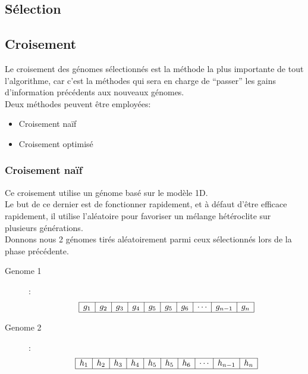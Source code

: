         \subsection{Sélection}
        \subsection{Croisement}
            Le croisement des génomes sélectionnés est la méthode la plus importante de tout l'algorithme, car c'est la méthodes qui sera en charge de ``passer'' les gains d'information précédents aux nouveaux génomes.\\
            Deux méthodes peuvent être employées:
            \begin{itemize}
                \item Croisement naïf
                \item Croisement optimisé
            \end{itemize}
            \subsubsection{Croisement naïf}
                Ce croisement utilise un génome basé sur le modèle 1D.\\
                Le but de ce dernier est de fonctionner rapidement, et à défaut d'être efficace rapidement, il utilise l'aléatoire pour favoriser un mélange hétéroclite sur plusieurs générations.\\
                    Donnons nous 2 génomes tirés aléatoirement parmi ceux sélectionnés lors de la phase précédente.\\
                    \begin{description}
                        \item[Genome 1]:\\
                            \[
                                \begin{array}{|c|c|c|c|c|c|c|c|c|c|}
                                    \hline
                                    g_1&g_2&g_3&g_4&g_5&g_5&g_6&\cdots&g_{n-1}&g_{n}\\
                                    \hline
                                \end{array}
                            \]
                        \item[Genome 2]:\\
                            \[
                                \begin{array}{|c|c|c|c|c|c|c|c|c|c|}
                                    \hline
                                    h_1&h_2&h_3&h_4&h_5&h_5&h_6&\cdots&h_{n-1}&h_{n}\\
                                    \hline
                                \end{array}
                            \]
                    \end{description}

